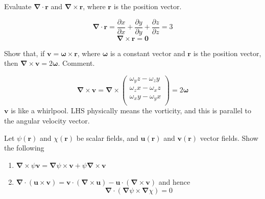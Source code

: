 \documentclass[a4paper]{article}
\begin{document}
\begin{qns}
Evaluate $\boldsymbol{\nabla}\cdot\mathbf{r}$ and $\boldsymbol{\nabla}\times\mathbf{r}$, where $\mathbf{r}$ is the position vector.
\end{qns}
\begin{ans}
$$\boldsymbol{\nabla}\cdot\mathbf{r}=\frac{\partial x}{\partial x}+\frac{\partial y}{\partial y}+\frac{\partial z}{\partial z}=3$$
$$\boldsymbol{\nabla}\times\mathbf{r}=\boldsymbol{0}$$
\end{ans}
\newpage
\begin{qns}
Show that, if $\mathbf{v}=\boldsymbol{\omega}\times\mathbf{r}$, where $\boldsymbol{\omega}$ is a constant vector and $\mathbf{r}$ is the position vector, then $\boldsymbol{\nabla}\times\mathbf{v}=2\boldsymbol{\omega}$. Comment.
\end{qns}
\begin{ans}
$$\boldsymbol{\nabla}\times\mathbf{v}=\boldsymbol{\nabla}\times\begin{pmatrix}\omega_yz-\omega_zy\\\omega_zx-\omega_xz\\\omega_xy-\omega_yx\\\end{pmatrix}=2\boldsymbol{\omega}$$
$\mathbf{v}$ is like a whirlpool. LHS physically means the vorticity, and this is parallel to the angular velocity vector.
\end{ans}
\begin{qns}
Let $\psi(\mathbf{r})$ and $\chi(\mathbf{r})$ be scalar fields, and $\mathbf{u}(\mathbf{r})$ and $\mathbf{v}(\mathbf{r})$ vector fields. Show the
following
\begin{enumerate}[label=(\alph*)]
    \item $\boldsymbol{\nabla}\times\psi\mathbf{v}=\boldsymbol{\nabla}\psi\times\mathbf{v}+\psi\boldsymbol{\nabla}\times\mathbf{v}$
    \item 
    $\boldsymbol{\nabla}\cdot(\mathbf{u}\times\mathbf{v})=\mathbf{v}\cdot(\boldsymbol{\nabla}\times\mathbf{u})-\mathbf{u}\cdot(\boldsymbol{\nabla}\times\mathbf{v})$
    and hence
    $$\boldsymbol{\nabla}\cdot(\boldsymbol{\nabla}\psi\times\boldsymbol{\nabla}\chi)=0$$
\end{enumerate}
\end{qns}
\end{document}
